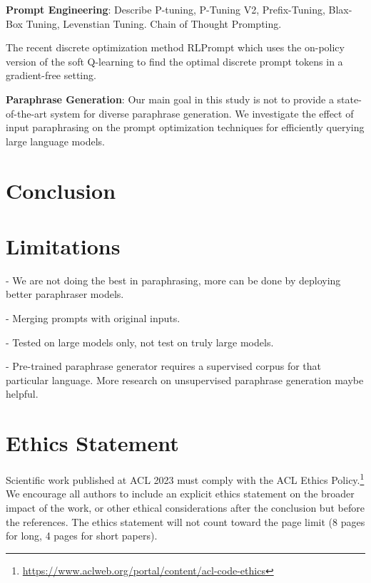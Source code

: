 \documentclass[11pt]{article}
\begin{document}
\noindent
{\bf Prompt Engineering}:
Describe P-tuning, P-Tuning V2, Prefix-Tuning, Blax-Box Tuning, Levenstian Tuning. Chain of Thought Prompting.

The recent discrete optimization method RLPrompt \cite{deng-etal-2022-rlprompt} which uses the on-policy version of the soft Q-learning \cite{https://doi.org/10.48550/arxiv.2106.07704} to find the optimal discrete prompt tokens in a gradient-free setting.

\noindent
{\bf Paraphrase Generation}:
Our main goal in this study is not to provide a state-of-the-art system for diverse paraphrase generation. We investigate the effect of input paraphrasing on the prompt optimization techniques for efficiently querying large language models.

\section{Conclusion}

\section{Limitations}
- We are not doing the best in paraphrasing, more can be done by deploying better paraphraser models.

- Merging prompts with original inputs.

- Tested on large models only, not test on truly large models.

- Pre-trained paraphrase generator requires a supervised corpus for that particular language. More research on unsupervised paraphrase generation maybe helpful.

\section*{Ethics Statement}
Scientific work published at ACL 2023 must comply with the ACL Ethics Policy.\footnote{\url{https://www.aclweb.org/portal/content/acl-code-ethics}} We encourage all authors to include an explicit ethics statement on the broader impact of the work, or other ethical considerations after the conclusion but before the references. The ethics statement will not count toward the page limit (8 pages for long, 4 pages for short papers).
\end{document}
